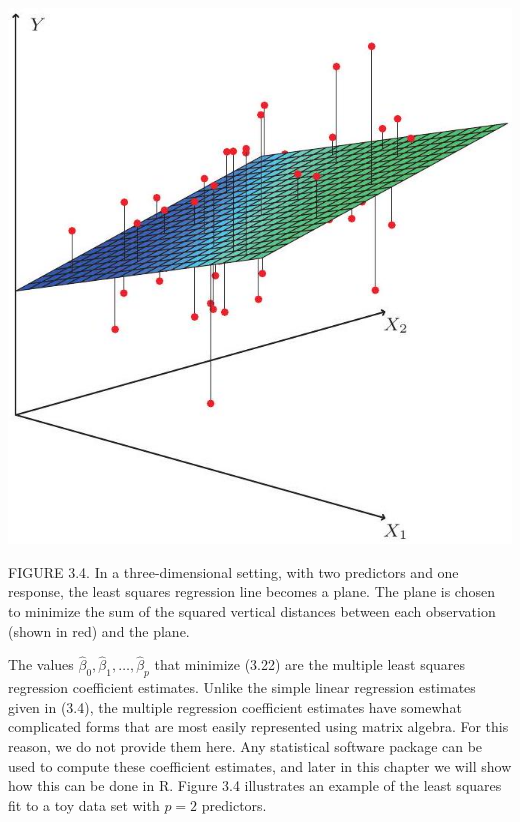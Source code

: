 \documentclass[10pt]{article}
\begin{document}
\begin{center}
\includegraphics[max width=\textwidth]{2025_05_05_efe77898333945044de4g-088}
\end{center}

FIGURE 3.4. In a three-dimensional setting, with two predictors and one response, the least squares regression line becomes a plane. The plane is chosen to minimize the sum of the squared vertical distances between each observation (shown in red) and the plane.

The values $\hat{\beta}_{0}, \hat{\beta}_{1}, \ldots, \hat{\beta}_{p}$ that minimize (3.22) are the multiple least squares regression coefficient estimates. Unlike the simple linear regression estimates given in (3.4), the multiple regression coefficient estimates have somewhat complicated forms that are most easily represented using matrix algebra. For this reason, we do not provide them here. Any statistical software package can be used to compute these coefficient estimates, and later in this chapter we will show how this can be done in R. Figure 3.4 illustrates an example of the least squares fit to a toy data set with $p=2$ predictors.
\end{document}
